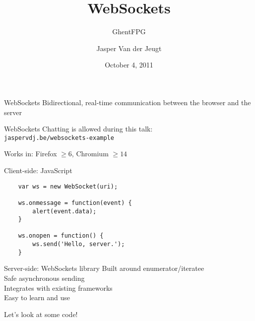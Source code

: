 \documentclass[20pt]{beamer}
\newcommand{\vspaced}{
    \vspace{5mm}
}
\begin{document}
\title{WebSockets}
\subtitle{GhentFPG}
\author{Jasper Van der Jeugt}
\date{October 4, 2011}

\begin{frame}[plain]
    \titlepage
\end{frame}

\begin{frame}{WebSockets}
    Bidirectional, real-time communication between the browser and the server
\end{frame}

\begin{frame}{WebSockets}
    Chatting is allowed during this talk: \\
    \small{\texttt{jaspervdj.be/websockets-example}} \\
    \vspaced
    Works in: Firefox $\geq 6$, Chromium $\geq 14$
\end{frame}

\begin{frame}[fragile]{Client-side: JavaScript}
    \begin{lstlisting}
    var ws = new WebSocket(uri);

    ws.onmessage = function(event) {
        alert(event.data);
    }

    ws.onopen = function() {
        ws.send('Hello, server.');
    }
    \end{lstlisting}
\end{frame}

\begin{frame}{Server-side: WebSockets library}
    Built around enumerator/iteratee \\
    Safe asynchronous sending \\
    Integrates with existing frameworks \\
    Easy to learn and use \\
\end{frame}

\begin{frame}[plain]
    Let's look at some code!
\end{frame}
\end{document}
